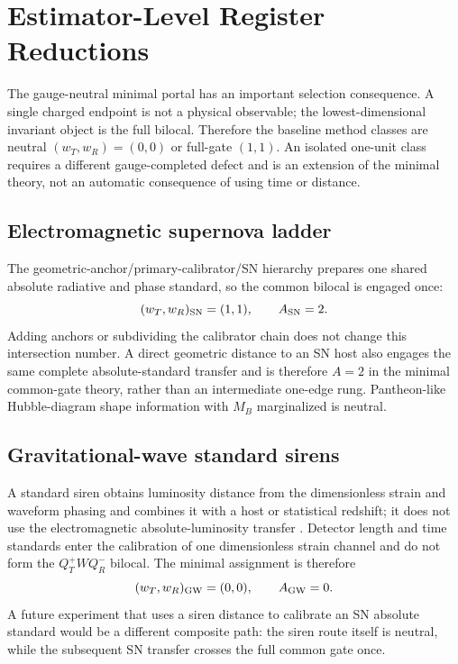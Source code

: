 \documentclass[aps,prd,twocolumn,10pt,superscriptaddress,nofootinbib]{revtex4-2}
\begin{document}
\section{Estimator-Level Register Reductions}
\label{sec:estimator_reductions}

The gauge-neutral minimal portal has an important selection consequence.  A
single charged endpoint is not a physical observable; the lowest-dimensional
invariant object is the full bilocal.  Therefore the baseline method classes
are neutral $(w_T,w_R)=(0,0)$ or full-gate $(1,1)$.  An isolated one-unit
class requires a different gauge-completed defect and is an extension of the
minimal theory, not an automatic consequence of using time or distance.

\subsection{Electromagnetic supernova ladder}

The geometric-anchor/primary-calibrator/SN hierarchy prepares one shared
absolute radiative and phase standard, so the common bilocal is engaged once:
\begin{equation}
 (w_T,w_R)_{\rm SN}=(1,1),
 \qquad A_{\rm SN}=2.
 \label{eq:pb_sn_weights}
\end{equation}
Adding anchors or subdividing the calibrator chain does not change this
intersection number.  A direct geometric distance to an SN host also engages
the same complete absolute-standard transfer and is therefore $A=2$ in the
minimal common-gate theory, rather than an intermediate one-edge rung.
Pantheon-like Hubble-diagram shape information with $M_B$ marginalized is
neutral.

\subsection{Gravitational-wave standard sirens}

A standard siren obtains luminosity distance from the dimensionless strain
and waveform phasing and combines it with a host or statistical redshift;
it does not use the electromagnetic absolute-luminosity transfer
\cite{Schutz1986,Abbott2017}.  Detector length and time standards enter the
calibration of one dimensionless strain channel and do not form the
$Q_T^+WQ_R^-$ bilocal.  The minimal assignment is therefore
\begin{equation}
 (w_T,w_R)_{\rm GW}=(0,0),
 \qquad A_{\rm GW}=0.
 \label{eq:pb_gw_weights}
\end{equation}
A future experiment that uses a siren distance to calibrate an SN absolute
standard would be a different composite path: the siren route itself is
neutral, while the subsequent SN transfer crosses the full common gate once.
\end{document}

